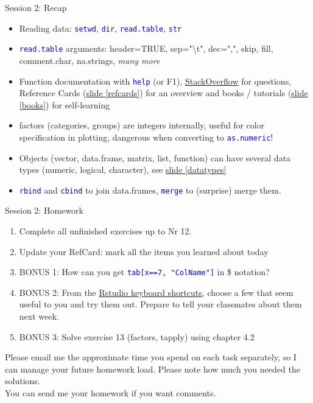 \documentclass[xcolor=table,           xcolor=dvipsnames]{beamer}\usepackage[]{graphicx}\usepackage[]{color}
\newcommand{\rcode}[1]{\texttt{\textcolor{Blue}{#1}}} %
\begin{document}
\begin{frame}[fragile]{Session 2: Recap}
\begin{itemize}[<+->]
\item Reading data: \rcode{setwd}, \rcode{dir}, \rcode{read.table}, \rcode{str}
\item \rcode{read.table} arguments: header=TRUE, sep="\textbackslash t", dec=",", skip, fill, comment.char, na.strings, \textit{many more}
\item Function documentation with \rcode{help} (or F1), \href{www.StackOverflow.com}{StackOverflow} for questions, Reference Cards (\hyperlink{refcards}{slide \ref{refcards}}) for an overview and books / tutorials (\hyperlink{books}{slide \ref{books}}) for self-learning
\item factors (categories, groups) are integers internally, useful for color specification in plotting, dangerous when converting to \rcode{as.numeric}!
\item Objects (vector, data.frame, matrix, list, function) can have several data types (numeric, logical, character), see \hyperlink{datatypes}{slide \ref{datatypes}}
\item \rcode{rbind} and \rcode{cbind} to join data.frames, \rcode{merge} to (surprise) merge them.
\end{itemize}
\end{frame}


\begin{frame}{Session 2: Homework}
\pause
\begin{enumerate}[<+->]
\item Complete all unfinished exercises up to Nr 12.
\item Update your RefCard: mark all the items you learned about today
\item BONUS 1: How can you get \rcode{tab[x==7, "ColName"]} in \$ notation?
\item BONUS 2: From the \href{https://support.rstudio.com/hc/en-us/articles/200711853-Keyboard-Shortcuts}{Rstudio keyboard shortcuts}, choose a few that seem useful to you and try them out. Prepare to tell your classmates about them next week.
\item BONUS 3: Solve exercise 13 (factors, tapply) using chapter 4.2
\end{enumerate}
\pause
Please email me the approximate time you spend on each task separately, so I can manage your future homework load.
Please note how much you needed the solutions.\\
You can send me your homework if you want comments.
\label{hw2}
\end{frame}
\end{document}
